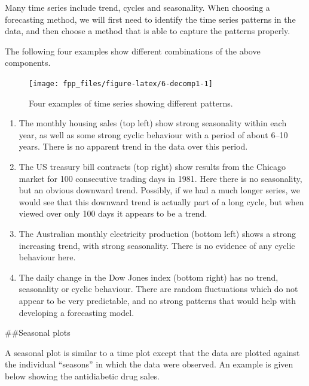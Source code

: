 \documentclass[]{book}
\newenvironment{Shaded}{\begin{snugshade}}{\end{snugshade}}
\newcommand{\DataTypeTok}[1]{\textcolor[rgb]{0.13,0.29,0.53}{#1}}
\newcommand{\KeywordTok}[1]{\textcolor[rgb]{0.13,0.29,0.53}{\textbf{#1}}}
\newcommand{\NormalTok}[1]{#1}
\newcommand{\OperatorTok}[1]{\textcolor[rgb]{0.81,0.36,0.00}{\textbf{#1}}}
\newcommand{\OtherTok}[1]{\textcolor[rgb]{0.56,0.35,0.01}{#1}}
\newcommand{\StringTok}[1]{\textcolor[rgb]{0.31,0.60,0.02}{#1}}
\begin{document}
Many time series include trend, cycles and seasonality. When choosing a forecasting method, we will first need to identify the time series patterns in the data, and then choose a method that is able to capture the patterns properly.

The following four examples show different combinations of the above components.

\begin{figure}

{\centering \texttt{[image: fpp\_files/figure-latex/6-decomp1-1]} 

}

\caption{Four examples of time series showing different patterns.}\label{fig:6-decomp1}
\end{figure}

\begin{enumerate}
\def\labelenumi{\arabic{enumi}.}
\item
  The monthly housing sales (top left) show strong seasonality within each year, as well as some strong cyclic behaviour with a period of about 6--10 years. There is no apparent trend in the data over this period.
\item
  The US treasury bill contracts (top right) show results from the Chicago market for 100 consecutive trading days in 1981. Here there is no seasonality, but an obvious downward trend. Possibly, if we had a much longer series, we would see that this downward trend is actually part of a long cycle, but when viewed over only 100 days it appears to be a trend.
\item
  The Australian monthly electricity production (bottom left) shows a strong increasing trend, with strong seasonality. There is no evidence of any cyclic behaviour here.
\item
  The daily change in the Dow Jones index (bottom right) has no trend, seasonality or cyclic behaviour. There are random fluctuations which do not appear to be very predictable, and no strong patterns that would help with developing a forecasting model.
\end{enumerate}

\#\#Seasonal plots

A seasonal plot is similar to a time plot except that the data are plotted against the individual ``seasons'' in which the data were observed. An example is given below showing the antidiabetic drug sales.

\begin{Shaded}
\end{Shaded}
\end{document}
